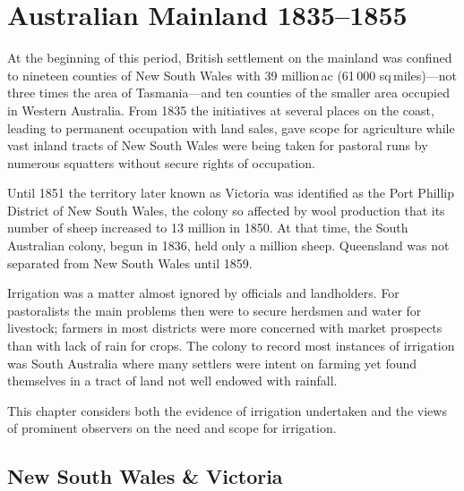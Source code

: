 
\setcounter{endnote}{0}

\chapter{Australian Mainland 1835--1855}
\label{ch:mainland} 

At the beginning of this period, British settlement on the mainland
was confined to nineteen counties of New South Wales with 39
million\,ac (61\,000 sq\,miles)---not three times the area of
Tasmania---and ten counties of the smaller area occupied in Western
Australia.  From 1835 the initiatives at several places on the coast,
leading to permanent occupation with land sales, gave scope for
agriculture while vast inland tracts of New South Wales were being
taken for pastoral runs by numerous squatters without secure rights of
occupation.

Until 1851 the territory later known as Victoria was identified as the
Port Phillip District of New South Wales, the colony so affected by
wool production that its number of sheep increased to 13 million in
1850.  At that time, the South Australian colony, begun in 1836, held
only a million sheep.  Queensland was not separated
from New South Wales until 1859.

Irrigation was a matter almost ignored by officials and landholders.
For pastoralists the main problems then were to secure herdsmen and
water for livestock; farmers in most districts were more concerned
with market prospects than with lack of rain for crops.  The colony to
record most instances of irrigation was South Australia where many
settlers were intent on farming yet found themselves in a tract of
land not well endowed with rainfall.

This chapter considers both the evidence of irrigation undertaken and
the views of prominent observers on the need and scope for irrigation.

\section*{New South Wales \& Victoria}

